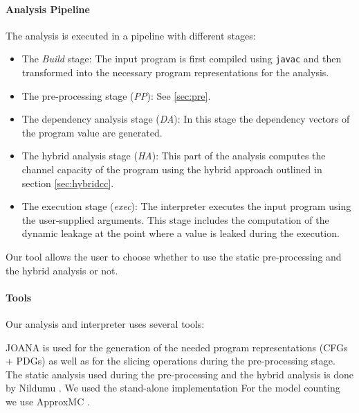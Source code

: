 \paragraph{Analysis Pipeline}
The analysis is executed in a pipeline with different stages:
\begin{itemize}
    \item The \emph{Build} stage: The input program is first compiled using \texttt{javac} and then transformed into the necessary program representations for the analysis.
    \item The pre-processing stage (\emph{PP}): See \ref{sec:pre}.
    \item The dependency analysis stage (\emph{DA}): In this stage the dependency vectors of the program value are generated.
    \item The hybrid analysis stage (\emph{HA}): This part of the analysis computes the channel capacity of the program using the hybrid approach outlined in section \ref{sec:hybridcc}.
    \item The execution stage (\emph{exec}): The interpreter executes the input program using the user-supplied arguments. This stage includes the computation of the dynamic leakage at the point where a value is leaked during the execution.
\end{itemize}
Our tool allows the user to choose whether to use the static pre-processing and the hybrid analysis or not.


\paragraph{Tools}
Our analysis and interpreter uses several tools:

JOANA is used for the generation of the needed program representations (CFGs + PDGs) as well as for the slicing operations during the pre-processing stage. The static analysis used during the pre-processing and the hybrid analysis is done by Nildumu \cite{bechberger18}. We used the stand-alone implementation For the model counting we use ApproxMC \cite{chakraborty13}.
